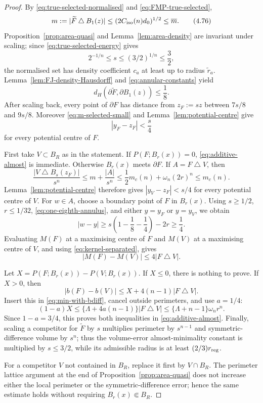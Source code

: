 \documentclass[11pt]{amsart}
\theoremstyle{definition}
\newcommand{\Per}{P}
\begin{document}
\begin{proof}
By \eqref{eq:true-selected-normalised} and
\eqref{eq:FMP-true-selected},
\[
   m:=|\widetilde F\mathbin{\triangle}B_1(z)|
   \le(2C_{\rm iso}(n)d_0)^{1/2}
   \le\overline m.
\tag{4.76}\label{eq:m-selected-small}
\]
Proposition~\ref{prop:area-quasi} and Lemma~\ref{lem:area-density}
are invariant under scaling; since
\eqref{eq:true-selected-energy} gives
\[
   2^{-1/n}\le s\le(3/2)^{1/n}\le\frac32,
\]
the normalised set has density coefficient \(c_a\) at least up to
radius \(\widetilde r_a\).  Lemma~\ref{lem:FJ-density-Hausdorff} and
\eqref{eq:annular-constants} yield
\[
   d_H(\partial\widetilde F,\partial B_1(z))\le\frac18.
\tag{4.77}\label{eq:one-eighth-annulus}
\]
After scaling back, every point of \(\partial F\) has distance from
\(z_F:=sz\) between \(7s/8\) and \(9s/8\).  Moreover
\eqref{eq:m-selected-small} and Lemma~\ref{lem:potential-centre}
give
\[
   |y_F-z_F|<\frac{s}{4}
\tag{4.78}\label{eq:yF-inner}
\]
for every potential centre of \(F\).

First take \(V\subset B_R\) as in the statement.  If
\(\Per(F;B_r(x))=0\), \eqref{eq:additive-almost} is immediate.
Otherwise \(B_r(x)\) meets \(\partial F\).  If
\(A=F\mathbin{\triangle}V\), then
\[
   \frac{|V\mathbin{\triangle}B_s(z_F)|}{s^n}
   \le m+\frac{|A|}{s^n}
   \le\frac12m_c(n)+\omega_n(2r)^n
   \le m_c(n).
\]
Lemma~\ref{lem:potential-centre} therefore gives
\(|y_V-z_F|<s/4\) for every potential centre of \(V\).
For \(w\in A\), choose a boundary point of \(F\) in \(B_r(x)\).
Using \(s\ge1/2\), \(r\le1/32\), \eqref{eq:one-eighth-annulus},
and either \(y=y_F\) or \(y=y_V\), we obtain
\[
   |w-y|
   \ge s\left(1-\frac18-\frac14\right)-2r
   \ge\frac14.
\tag{4.79}\label{eq:kernel-separated}
\]
Evaluating \(M(F)\) at a maximising centre of \(F\) and \(M(V)\) at
a maximising centre of \(V\), and using \eqref{eq:kernel-separated},
gives
\[
   |M(F)-M(V)|\le4|F\mathbin{\triangle}V|.
\tag{4.80}\label{eq:M-local-lip}
\]

Let \(X=\Per(F;B_r(x))-\Per(V;B_r(x))\).  If \(X\le0\), there is
nothing to prove.  If \(X>0\), then
\[
   |b(F)-b(V)|
   \le X+4(n-1)|F\mathbin{\triangle}V|.
\]
Insert this in \eqref{eq:min-with-bdiff}, cancel outside perimeters,
and use \(a=1/4\):
\[
   (1-a)X
   \le\{\Lambda+4a(n-1)\}|F\mathbin{\triangle}V|
   \le\{\Lambda+n-1\}\omega_n r^n.
\]
Since \(1-a=3/4\), this proves both inequalities in
\eqref{eq:additive-almost}.  Finally, scaling a competitor
for \(\widetilde F\) by \(s\) multiplies perimeter by \(s^{n-1}\)
and symmetric-difference volume by \(s^n\); thus the volume-error
almost-minimality constant is multiplied by \(s\le3/2\), while its
admissible radius is at least \((2/3)r_{\rm reg}\).

For a competitor \(V\) not contained in \(B_R\), replace it first by
\(V\cap B_R\).  The perimeter lattice argument at the end of
Proposition~\ref{prop:area-quasi} does not increase either the local
perimeter or the symmetric-difference error; hence the same estimate
holds without requiring \(B_r(x)\Subset B_R\).
\end{proof}
\end{document}
